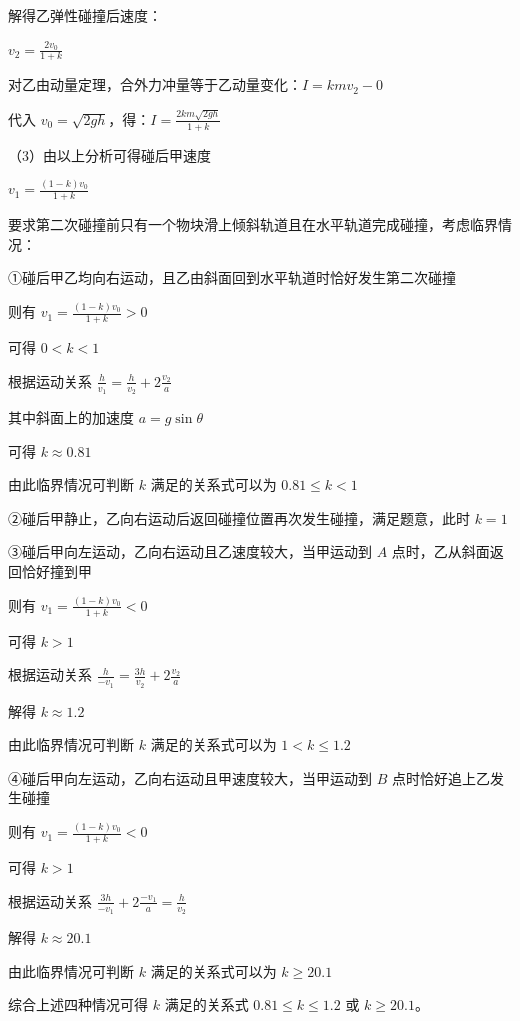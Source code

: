 \documentclass[\gkver]{gaokaozhenti}
\begin{document}
\begin{enumerate}
{解得乙弹性碰撞后速度：

$v_{2} = \frac{2v_{0}}{1 + k}$

对乙由动量定理，合外力冲量等于乙动量变化：$I = kmv_{2} - 0$

代入 $v_{0} = \sqrt{2gh}$，得：$I = \frac{2km\sqrt{2gh}}{1 + k}$

（3）由以上分析可得碰后甲速度

$v_{1} = \frac{(1 - k)v_{0}}{1 + k}$

要求第二次碰撞前只有一个物块滑上倾斜轨道且在水平轨道完成碰撞，考虑临界情况：

①碰后甲乙均向右运动，且乙由斜面回到水平轨道时恰好发生第二次碰撞

则有 $v_{1} = \frac{(1 - k)v_{0}}{1 + k} > 0$

可得 $0 < k < 1$

根据运动关系 $\frac{h}{v_{1}} = \frac{h}{v_{2}} + 2\frac{v_{2}}{a}$

其中斜面上的加速度 $a = g \sin \theta$

可得 $k \approx 0.81$

由此临界情况可判断 $k$ 满足的关系式可以为 $0.81 \leqslant k < 1$

②碰后甲静止，乙向右运动后返回碰撞位置再次发生碰撞，满足题意，此时 $k = 1$

③碰后甲向左运动，乙向右运动且乙速度较大，当甲运动到 $A$ 点时，乙从斜面返回恰好撞到甲

则有 $v_{1} = \frac{(1 - k)v_{0}}{1 + k} < 0$

可得 $k > 1$

根据运动关系 $\frac{h}{-v_{1}} = \frac{3h}{v_{2}} + 2\frac{v_{2}}{a}$

解得 $k \approx 1.2$

由此临界情况可判断 $k$ 满足的关系式可以为 $1 < k \leqslant 1.2$

④碰后甲向左运动，乙向右运动且甲速度较大，当甲运动到 $B$ 点时恰好追上乙发生碰撞

则有 $v_{1} = \frac{(1 - k)v_{0}}{1 + k} < 0$

可得 $k > 1$

根据运动关系 $\frac{3h}{-v_{1}} + 2\frac{-v_{1}}{a} = \frac{h}{v_{2}}$

解得 $k \approx 20.1$

由此临界情况可判断 $k$ 满足的关系式可以为 $k \geqslant 20.1$

综合上述四种情况可得 $k$ 满足的关系式 $0.81 \leqslant k \leqslant 1.2$ 或 $k \geqslant 20.1$。
}

\end{enumerate}
\end{document}
